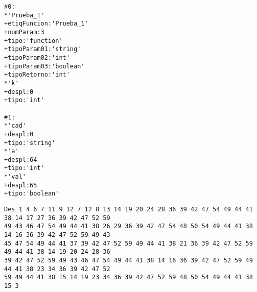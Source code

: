 \begin{enumerate}
    \begin{tcolorbox}[title={Volcado del fichero de la tabla de símbolos}, colback=white]
        \begin{lstlisting}
#0:
*'Prueba_1'
+etiqFuncion:'Prueba_1'
+numParam:3
+tipo:'function'
+tipoParam01:'string'
+tipoParam02:'int'
+tipoParam03:'boolean'
+tipoRetorno:'int'
*'k'
+despl:0
+tipo:'int'

#1:
*'cad'
+despl:0
+tipo:'string'
*'a'
+despl:64
+tipo:'int'
*'val'
+despl:65
+tipo:'boolean'
        \end{lstlisting}
    \end{tcolorbox}

    \begin{tcolorbox}[title={Volcado del parse}, colback=white]
        \begin{lstlisting}
Des 1 4 6 7 11 9 12 7 12 8 13 14 19 20 24 28 36 39 42 47 54 49 44 41 38 14 17 27 36 39 42 47 52 59
49 43 46 47 54 49 44 41 38 26 29 36 39 42 47 54 48 50 54 49 44 41 38 14 16 36 39 42 47 52 59 49 43
45 47 54 49 44 41 37 39 42 47 52 59 49 44 41 38 21 36 39 42 47 52 59 49 44 41 38 14 19 20 24 28 36
39 42 47 52 59 49 43 46 47 54 49 44 41 38 14 16 36 39 42 47 52 59 49 44 41 38 23 34 36 39 42 47 52
59 49 44 41 38 15 14 19 23 34 36 39 42 47 52 59 48 50 54 49 44 41 38 15 3
        \end{lstlisting}
    \end{tcolorbox}


\end{enumerate}
